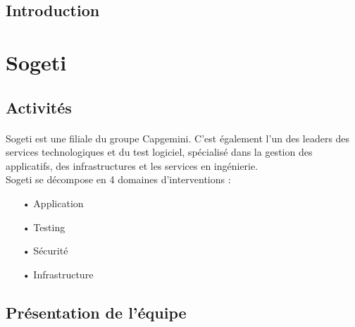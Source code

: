 \documentclass[a4paper,12pt]{report}
\begin{document}
\sffamily




\newpage
\begin{center}
\section*{Introduction}
\end{center}
\paragraph{}



\tableofcontents

\newpage
\section{Sogeti}
	\subsection{Activités}
	\paragraph*{}
	Sogeti est une filiale du groupe Capgemini. C'est également l’un des leaders des services technologiques et du test logiciel, spécialisé dans la gestion des applicatifs, des infrastructures et les services en ingénierie.\\
	Sogeti se décompose en 4 domaines d'interventions :\\
	\begin{itemize}
		\item[•] Application
		\item[•] Testing
		\item[•] Sécurité
		\item[•] Infrastructure
	\end{itemize}
	
	\subsection{Présentation de l'équipe}
\end{document}
